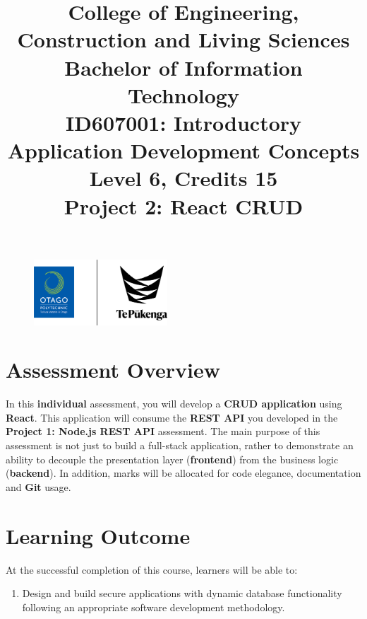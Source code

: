 \documentclass{article}
\author{}
\begin{document}
 

\begin{figure}
	\centering
	\includegraphics[width=50mm]{../img/logo.png}
\end{figure}

\title{College of Engineering, Construction and Living Sciences\\Bachelor of Information Technology\\ID607001: Introductory Application Development Concepts\\Level 6, Credits 15\\\textbf{Project 2: React CRUD}}
\date{}
\maketitle

\section*{Assessment Overview}
In this \textbf{individual} assessment, you will develop a \textbf{CRUD application} using \textbf{React}. This application will consume the \textbf{REST API} you developed in the \textbf{Project 1: Node.js REST API} assessment. The main purpose of this assessment is not just to build a full-stack application, rather to demonstrate an ability to decouple the presentation layer (\textbf{frontend}) from the business logic (\textbf{backend}). In addition, marks will be allocated for code elegance, documentation and \textbf{Git} usage. 

\section*{Learning Outcome}
At the successful completion of this course, learners will be able to:
\begin{enumerate}
	\item Design and build secure applications with dynamic database functionality following an appropriate software development methodology.
\end{enumerate}
\end{document}
